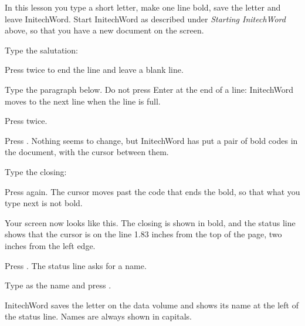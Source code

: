 In this lesson you type a short letter, make one line bold, save the letter
and leave InitechWord.  Start InitechWord as described under
\textit{Starting InitechWord} above, so that you have a new document on the
screen.

\begin{WPSteps}
\item Type the salutation:
\item Press  twice to end the line and leave a blank line.
\item Type the paragraph below.  Do not press Enter at the end of a line:
InitechWord moves to the next line when the line is full.
\item Press  twice.
\end{WPSteps}

\begin{WPSteps}
\item Press .  Nothing seems to change, but InitechWord has
put a pair of bold codes in the document, with the cursor between them.
\item Type the closing:
\item Press  again.  The cursor moves past the code that
ends the bold, so that what you type next is not bold.
\end{WPSteps}
Your screen now looks like this.  The closing is shown in bold, and the
status line shows that the cursor is on the line 1.83 inches from the top
of the page, two inches from the left edge.

\begin{WPSteps}
\item Press .  The status line asks for a name.
\item Type  as the name and press .
\end{WPSteps}
InitechWord saves the letter on the data volume and shows its name at the
left of the status line.  Names are always shown in capitals.

